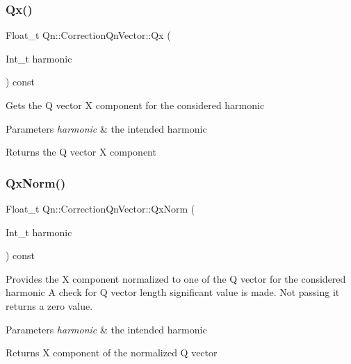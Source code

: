 \subsubsection{\texorpdfstring{Qx()}{Qx()}}
{\footnotesize\ttfamily Float\+\_\+t Qn\+::\+Correction\+Qn\+Vector\+::\+Qx (\begin{DoxyParamCaption}\item[{Int\+\_\+t}]{harmonic }\end{DoxyParamCaption}) const\hspace{0.3cm}{\ttfamily [inline]}}

Gets the Q vector X component for the considered harmonic 
\begin{DoxyParams}{Parameters}
{\em harmonic} & the intended harmonic \\
\hline
\end{DoxyParams}
\begin{DoxyReturn}{Returns}
the Q vector X component 
\end{DoxyReturn}
\mbox{\label{classQn_1_1CorrectionQnVector_abf503da4fb27fc1e046fbd195a841926}} 
\subsubsection{\texorpdfstring{Qx\+Norm()}{QxNorm()}}
{\footnotesize\ttfamily Float\+\_\+t Qn\+::\+Correction\+Qn\+Vector\+::\+Qx\+Norm (\begin{DoxyParamCaption}\item[{Int\+\_\+t}]{harmonic }\end{DoxyParamCaption}) const\hspace{0.3cm}{\ttfamily [inline]}}

Provides the X component normalized to one of the Q vector for the considered harmonic A check for Q vector length significant value is made. Not passing it returns a zero value. 
\begin{DoxyParams}{Parameters}
{\em harmonic} & the intended harmonic \\
\hline
\end{DoxyParams}
\begin{DoxyReturn}{Returns}
X component of the normalized Q vector 
\end{DoxyReturn}
\mbox{\label{classQn_1_1CorrectionQnVector_adf6c66295489c2638e9f692a77f6ca9b}} 
